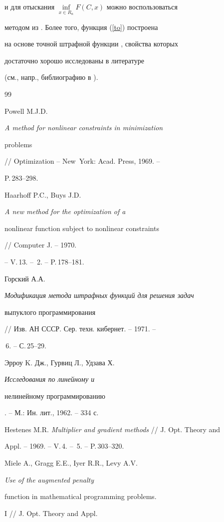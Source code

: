 и для отыскания $\inf\limits_{x\in R_n}F(C,x)$ можно воспользоваться


методом из \cite{Zab}. Более того, функция (\ref{to}) построена


на основе точной штрафной функции \cite{Erem}, свойства которых


достаточно хорошо исследованы в литературе


(см., напр., библиографию в \cite{toch}).





\begin{thebibliography}{99}







Powell M.J.D. {\it A method for nonlinear constraints in minimization


problems} // Optimization -- New~York: Acad. Press, 1969. --


P.\,283--298.




Haarhoff P.C., Buys J.D. {\it A new method for the optimization of a 


nonlinear function subject to nonlinear constraints} // Computer J. -- 1970.


-- V.\,13. -- \No\,2. -- P.\,178--181.




Горский А.А. {\it Модификация метода штрафных функций для решения задач 


выпуклого программирования} // Изв. АН СССР. Сер. техн. кибернет. -- 1971. --


\No\,6. -- С.\,25--29. 




Эрроу K. Дж., Гурвиц Л., Удзава Х. {\it Исследования по линейному и 


нелинейному программированию}. -- М.: Ин. лит., 1962. -- 334 с.




Hestenes M.R. {\it Multiplier and gradient methods} // J. Opt. Theory and


Appl. -- 1969. -- V.\,4. -- \No\,5. -- P.\,303--320.




Miele A., Gragg E.E., Iyer R.R., Levy A.V. {\it Use of the augmented penalty


function in mathematical programming problems.} I // J. Opt. Theory and Appl.



\end{thebibliography}
